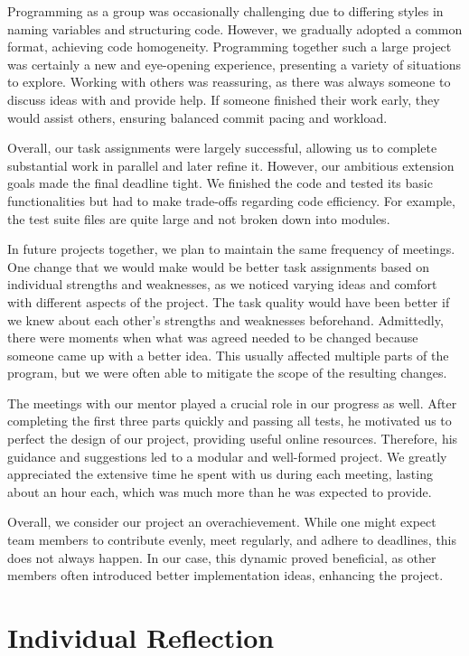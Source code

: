\documentclass{article}
\begin{document}
Programming as a group was occasionally challenging due to differing styles in naming variables and structuring code. However, we gradually adopted a common format, achieving code homogeneity. Programming together such a large project was certainly a new and eye-opening experience, presenting a variety of situations to explore. Working with others was reassuring, as there was always someone to discuss ideas with and provide help. If someone finished their work early, they would assist others, ensuring balanced commit pacing and workload.

Overall, our task assignments were largely successful, allowing us to complete substantial work in parallel and later refine it. However, our ambitious extension goals made the final deadline tight. We finished the code and tested its basic functionalities but had to make trade-offs regarding code efficiency. For example, the test suite files are quite large and not broken down into modules.

In future projects together, we plan to maintain the same frequency of meetings. One change that we would make would be better task assignments based on individual strengths and weaknesses, as we noticed varying ideas and comfort with different aspects of the project. The task quality would have been better if we knew about each other’s strengths and weaknesses beforehand. Admittedly, there were moments when what was agreed needed to be changed because someone came up with a better idea. This usually affected multiple parts of the program, but we were often able to mitigate the scope of the resulting changes.

The meetings with our mentor played a crucial role in our progress as well. After completing the first three parts quickly and passing all tests, he motivated us to perfect the design of our project, providing useful online resources. Therefore, his guidance and suggestions led to a modular and well-formed project. We greatly appreciated the extensive time he spent with us during each meeting, lasting about an hour each, which was much more than he was expected to provide.

Overall, we consider our project an overachievement. While one might expect team members to contribute evenly, meet regularly, and adhere to deadlines, this does not always happen. In our case, this dynamic proved beneficial, as other members often introduced better implementation ideas, enhancing the project.

\section{Individual Reflection}
\end{document}
